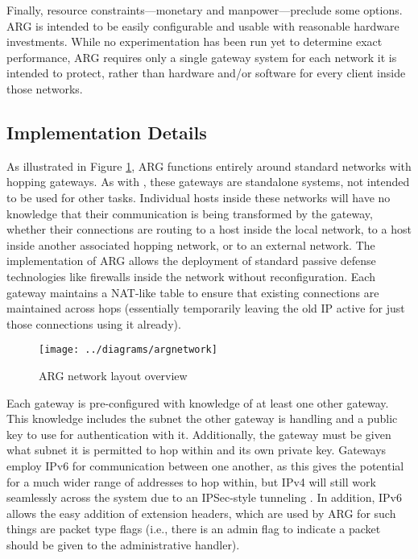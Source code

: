 \par Finally, resource constraints---monetary and manpower---preclude some options. ARG is intended to be easily configurable and usable with reasonable hardware investments. While no experimentation has been run yet to determine exact performance, ARG requires only a single gateway system for each network it is intended to protect, rather than hardware and/or software for every client inside those networks.

\subsection{Implementation Details}

\par As illustrated in Figure \ref{fig:argnetwork}, ARG functions entirely around standard networks with hopping gateways. As with \cite{TAO}, these gateways are standalone systems, not intended to be used for other tasks. Individual hosts inside these networks will have no knowledge that their communication is being transformed by the gateway, whether their connections are routing to a host inside the local network, to a host inside another associated hopping network, or to an external network. The implementation of ARG allows the deployment of standard passive defense technologies like firewalls inside the network without reconfiguration. Each gateway maintains a NAT-like table to ensure that existing connections are maintained across hops (essentially temporarily leaving the old IP active for just those connections using it already).

\begin{figure}
	\centering
	\texttt{[image: ../diagrams/argnetwork]}
	\caption{ARG network layout overview}
	\label{fig:argnetwork}
\end{figure}

\par Each gateway is pre-configured with knowledge of at least one other gateway. This knowledge includes the subnet the other gateway is handling and a public key to use for authentication with it. Additionally, the gateway must be given what subnet it is permitted to hop within and its own private key. Gateways employ IPv6 for communication between one another, as this gives the potential for a much wider range of addresses to hop within, but IPv4 will still work seamlessly across the system due to an IPSec-style tunneling \cite{rfc4301}. In addition, IPv6 allows the easy addition of extension headers, which are used by ARG for such things are packet type flags (i.e., there is an admin flag to indicate a packet should be given to the administrative handler).

